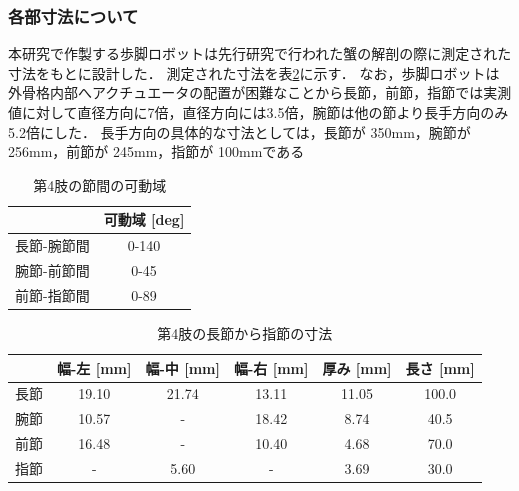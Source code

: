 \subsubsection{各部寸法について}
本研究で作製する歩脚ロボットは先行研究\cite{hasegawa}で行われた蟹の解剖の際に測定された寸法をもとに設計した．
測定された寸法を表\ref{tab:4setu}に示す．
なお，歩脚ロボットは外骨格内部へアクチュエータの配置が困難なことから長節，前節，指節では実測値に対して直径方向に7倍，直径方向には3.5倍，腕節は他の節より長手方向のみ5.2倍にした．
長手方向の具体的な寸法としては，長節が 350mm，腕節が 256mm，前節が 245mm，指節が 100mmである
\begin{table}[ht]
  \centering
  \vspace{5mm}
  \caption{第4肢の節間の可動域}
  \label{tab:4setukadou}
  \vspace{-3mm}
  \begin{tabular}{|l|c|}
  \hline
         & \multicolumn{1}{l|}{可動域 {[}deg{]}} \\ \hline
  長節-腕節間 & 0-140                            \\ \hline
  腕節-前節間 & 0-45                             \\ \hline
  前節-指節間 & 0-89                            \\ \hline
  \end{tabular}
\end{table}
\begin{table}[ht]
  \centering
  \caption{第4肢の長節から指節の寸法}
  \label{tab:4setu}
  \vspace{-3mm}
  \begin{tabular}{|l|c|c|c|c|c|}
  \hline
     & \multicolumn{1}{l|}{幅-左 [mm]} & \multicolumn{1}{l|}{幅-中 [mm]} & \multicolumn{1}{l|}{幅-右 [mm]} & \multicolumn{1}{l|}{厚み [mm]} & \multicolumn{1}{l|}{長さ [mm]} \\ \hline
  長節 & 19.10                       & 21.74                       & 13.11                       & 11.05                       & 100.0                       \\ \hline
  腕節 & 10.57                       & -                           & 18.42                       & 8.74                        & 40.5                        \\ \hline
  前節 & 16.48                       & -                           & 10.40                       & 4.68                        & 70.0                        \\ \hline
  指節 & -                           & 5.60                        & -                           & 3.69                        & 30.0                        \\ \hline
  \end{tabular}
\end{table}
